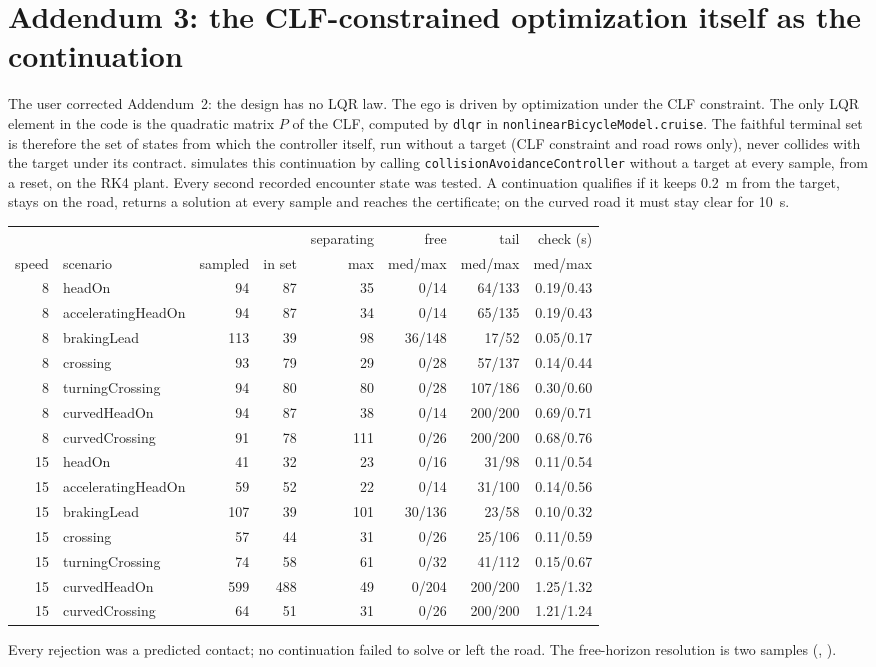 \documentclass[11pt]{article}
\begin{document}
\section{Addendum 3: the CLF-constrained optimization itself as the continuation}
The user corrected Addendum~2: the design has no LQR law. The ego is driven by
optimization under the CLF constraint. The only LQR element in the code is the
quadratic matrix $P$ of the CLF, computed by \texttt{dlqr} in
\texttt{nonlinearBicycleModel.cruise}. The faithful terminal set is therefore
the set of states from which the controller itself, run without a target (CLF
constraint and road rows only), never collides with the target under its
contract.  simulates this
continuation by calling \texttt{collisionAvoidanceController} without a target
at every sample, from a reset, on the RK4 plant. Every second recorded
encounter state was tested. A continuation qualifies if it keeps 0.2~m from the
target, stays on the road, returns a solution at every sample and reaches the
certificate; on the curved road it must stay clear for 10~s.

\begin{center}
\begin{tabular}{rlrrrrrr}
\toprule
 & & & & separating & free & tail & check (s)\\
speed & scenario & sampled & in set & max & med/max & med/max & med/max\\
\midrule
8 & headOn & 94 & 87 & 35 & 0/14 & 64/133 & 0.19/0.43\\
8 & acceleratingHeadOn & 94 & 87 & 34 & 0/14 & 65/135 & 0.19/0.43\\
8 & brakingLead & 113 & 39 & 98 & 36/148 & 17/52 & 0.05/0.17\\
8 & crossing & 93 & 79 & 29 & 0/28 & 57/137 & 0.14/0.44\\
8 & turningCrossing & 94 & 80 & 80 & 0/28 & 107/186 & 0.30/0.60\\
8 & curvedHeadOn & 94 & 87 & 38 & 0/14 & 200/200 & 0.69/0.71\\
8 & curvedCrossing & 91 & 78 & 111 & 0/26 & 200/200 & 0.68/0.76\\
15 & headOn & 41 & 32 & 23 & 0/16 & 31/98 & 0.11/0.54\\
15 & acceleratingHeadOn & 59 & 52 & 22 & 0/14 & 31/100 & 0.14/0.56\\
15 & brakingLead & 107 & 39 & 101 & 30/136 & 23/58 & 0.10/0.32\\
15 & crossing & 57 & 44 & 31 & 0/26 & 25/106 & 0.11/0.59\\
15 & turningCrossing & 74 & 58 & 61 & 0/32 & 41/112 & 0.15/0.67\\
15 & curvedHeadOn & 599 & 488 & 49 & 0/204 & 200/200 & 1.25/1.32\\
15 & curvedCrossing & 64 & 51 & 31 & 0/26 & 200/200 & 1.21/1.24\\
\bottomrule
\end{tabular}
\end{center}
Every rejection was a predicted contact; no continuation failed to solve or
left the road. The free-horizon resolution is two samples
(, ).
\end{document}
